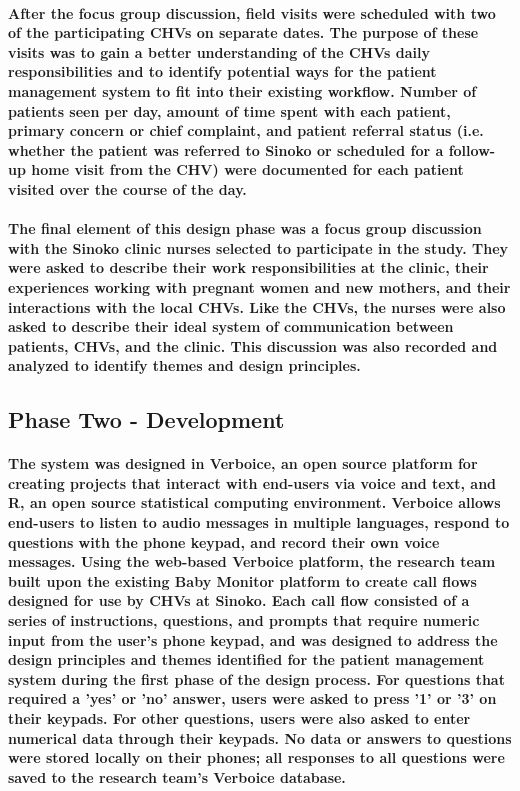 \paragraph{After the focus group discussion, field visits were scheduled with two of the participating CHVs on separate dates. The purpose of these visits was to gain a better understanding of the CHVs daily responsibilities and to identify potential ways for the patient management system to fit into their existing workflow. Number of patients seen per day, amount of time spent with each patient, primary concern or chief complaint, and patient referral status (i.e. whether the patient was referred to Sinoko or scheduled for a follow-up home visit from the CHV) were documented for each patient visited over the course of the day.}

\paragraph{The final element of this design phase was a focus group discussion with the Sinoko clinic nurses selected to participate in the study. They were asked to describe their work responsibilities at the clinic, their experiences working with pregnant women and new mothers, and their interactions with the local CHVs. Like the CHVs, the nurses were also asked to  describe their ideal system of communication between patients, CHVs, and the clinic. This discussion was also recorded and analyzed to identify themes and design principles.}


\subsection{Phase Two - Development}
\paragraph{The system was designed in Verboice, an open source platform for creating projects that interact with end-users via voice and text, and R, an open source statistical computing environment. Verboice allows end-users to listen to audio messages in multiple languages, respond to questions with the phone keypad, and  record their own voice messages. Using the web-based Verboice platform, the research team built upon the existing Baby Monitor platform to create call flows designed for use by CHVs at Sinoko. Each call flow consisted of a series of instructions, questions, and prompts that require numeric input from the user's phone keypad, and was designed to address the design principles and themes identified for the patient management system during the first phase of the design process. For questions that required a 'yes' or 'no' answer, users were asked to press '1' or '3' on their keypads. For other questions, users were also asked to enter numerical data through their keypads. No data or answers to questions were stored locally on their phones; all responses to all questions were saved to the research team's Verboice database.} 

